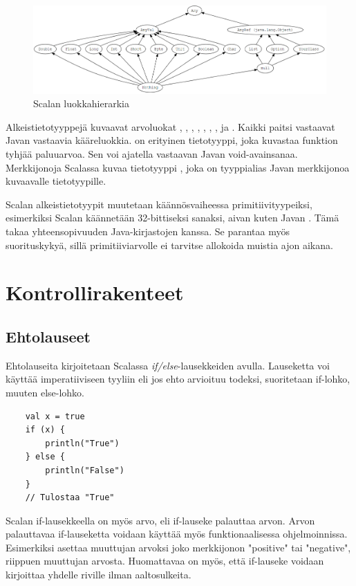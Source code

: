 \begin{figure}[h]
    \centering \includegraphics[width=1\textwidth]{kuvat/typehierarchy}
    \caption{Scalan luokkahierarkia}
    \label{tyyppihierarkia}
\end{figure}

Alkeistietotyyppejä kuvaavat arvoluokat , , , , , , ,  ja . Kaikki paitsi  vastaavat Javan vastaavia kääreluokkia.  on erityinen tietotyyppi, joka kuvastaa funktion tyhjää paluuarvoa. Sen voi ajatella vastaavan Javan void-avainsanaa. Merkkijonoja Scalassa kuvaa tietotyyppi , joka on tyyppialias Javan merkkijonoa kuvaavalle tietotyypille.
\cite[Luku 5]{prorgrammingInScala3rd}

Scalan alkeistietotyypit muutetaan käännösvaiheessa primitiivityypeiksi, esimerkiksi Scalan  käännetään 32-bittiseksi sanaksi, aivan kuten Javan . Tämä takaa yhteensopivuuden Java-kirjastojen kanssa. Se parantaa myös suorituskykyä, sillä primitiiviarvolle ei tarvitse allokoida muistia ajon aikana.
\cite[Luku 6]{prorgrammingInScala3rd}


\section{Kontrollirakenteet}

\subsection{Ehtolauseet}
Ehtolauseita kirjoitetaan Scalassa \textit{if/else}-lausekkeiden avulla. Lauseketta voi käyttää imperatiiviseen tyyliin eli jos ehto arvioituu todeksi, suoritetaan if-lohko, muuten else-lohko.
\begin{lstlisting}
    val x = true
    if (x) {
        println("True")
    } else {
        println("False")
    }
    // Tulostaa "True"
\end{lstlisting}
Scalan if-lausekkeella on myös arvo, eli if-lauseke palauttaa arvon. Arvon palauttavaa if-lauseketta voidaan käyttää myös funktionaalisessa ohjelmoinnissa. Esimerkiksi  asettaa muuttujan  arvoksi joko merkkijonon "positive" tai "negative", riippuen muuttujan  arvosta. Huomattavaa on myös, että if-lauseke voidaan kirjoittaa yhdelle riville ilman aaltosulkeita. 
\cite[Luku 2.1]{scalaForTheImpatient}
        
